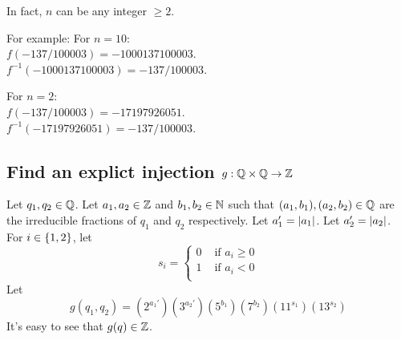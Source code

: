         In fact, $n$ can be any integer $\geq 2$.
        \begin{multicols}{2}
            For example: For $n = 10$: \\ 
                $f(-137/100003) = -1000137100003$. \\ 
                $f^{-1}(-1000137100003) = -137/100003$.
    
            For $n = 2$: \\ 
                $f(-137/100003) = -17197926051$. \\ 
                $f^{-1}(-17197926051) = -137/100003$.
    
    
        \end{multicols}

    \newpage
    \subsection{Find an explict injection $g: \mathbb{Q} \times \mathbb{Q} \to \mathbb{Z}$}
        Let $q_1, q_2 \in \mathbb{Q}$.
        Let $a_1, a_2 \in \mathbb{Z}$ and $b_1, b_2 \in \mathbb{N}$ such that 
        $(a_1, b_1), (a_2,b_2) \in \mathbb{Q}$ are the irreducible fractions of 
        $q_1$ and $q_2$ respectively.
        Let $a_1' = \left|a_1\right|$.
        Let $a_2' = \left|a_2\right|$.
        For $i \in \{ 1,2 \}$, let
        \[
            s_i = 
            \begin{cases}
                0 & \text{ if $a_i \geq 0$} \\ 
                1 & \text{ if $a_i < 0$} \\ 
            \end{cases}
        \]
        Let 
        \[
            g(q_1, q_2) =
                (2^{a_1'}) (3^{a_2'}) (5^{b_1}) (7^{b_2}) (11^{s_1}) (13^{s_2})
        \]
        It's easy to see that $g(q) \in\mathbb{Z}$.

